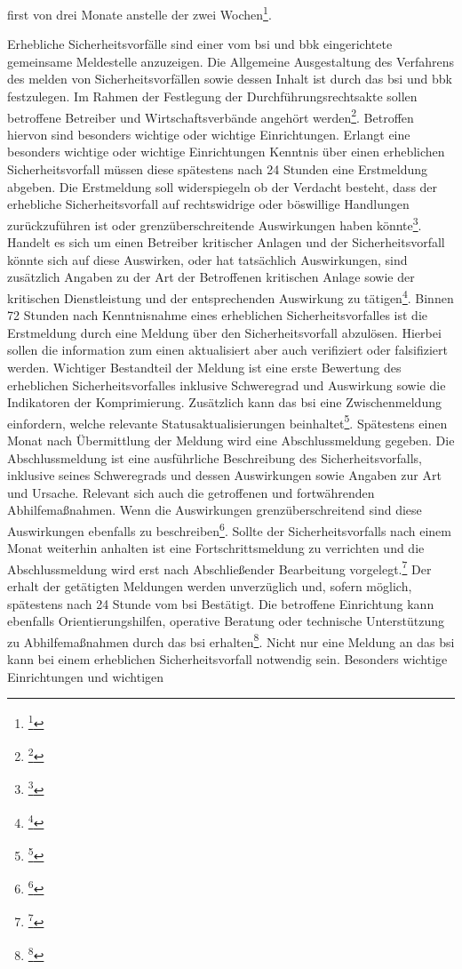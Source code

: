\documentclass[11pt,a4paper,hidelinks]{article}   %
\begin{document}
first von drei Monate anstelle der zwei Wochen\footnote{\footcite[Vgl. §34,][]{NIS2UmsuCG}}.\medbreak

        Erhebliche Sicherheitsvorfälle sind einer vom \gls{bsi} und \gls{bbk} eingerichtete gemeinsame Meldestelle anzuzeigen. Die Allgemeine Ausgestaltung des Verfahrens des melden von Sicherheitsvorfällen sowie dessen Inhalt ist durch das \gls{bsi} und \gls{bbk} festzulegen. Im Rahmen der Festlegung der Durchführungsrechtsakte sollen betroffene Betreiber und Wirtschaftsverbände angehört werden\footnote{\footcite[Vgl. §32, Absatz 4,][]{NIS2UmsuCG}}. Betroffen hiervon sind besonders wichtige oder wichtige Einrichtungen. Erlangt eine besonders wichtige oder wichtige Einrichtungen Kenntnis über einen erheblichen Sicherheitsvorfall müssen diese spätestens nach 24 Stunden eine Erstmeldung abgeben. Die Erstmeldung soll widerspiegeln ob der Verdacht besteht, dass der erhebliche Sicherheitsvorfall auf rechtswidrige oder böswillige Handlungen zurückzuführen ist oder grenzüberschreitende Auswirkungen haben könnte\footnote{\footcite[Vgl. §32, Absatz 1,][]{NIS2UmsuCG}}. Handelt es sich um einen Betreiber kritischer Anlagen und der Sicherheitsvorfall könnte sich auf diese Auswirken, oder hat tatsächlich Auswirkungen, sind zusätzlich Angaben zu der Art der Betroffenen kritischen Anlage sowie der kritischen Dienstleistung und der entsprechenden Auswirkung zu tätigen\footnote{\footcite[Vgl. §32, Absatz 3,][]{NIS2UmsuCG}}. Binnen 72 Stunden nach Kenntnisnahme eines erheblichen Sicherheitsvorfalles ist die Erstmeldung durch eine Meldung über den Sicherheitsvorfall abzulösen. Hierbei sollen die information zum einen aktualisiert aber auch verifiziert oder falsifiziert werden. Wichtiger Bestandteil der Meldung ist eine erste Bewertung des erheblichen Sicherheitsvorfalles inklusive Schweregrad und Auswirkung sowie die Indikatoren der Komprimierung. Zusätzlich kann das \gls{bsi} eine Zwischenmeldung einfordern, welche relevante Statusaktualisierungen beinhaltet\footnote{\footcite[Vgl. §32, Absatz 1, Nummer 2 und 3,][]{NIS2UmsuCG}}.  Spätestens einen Monat nach Übermittlung der Meldung wird eine Abschlussmeldung gegeben. Die Abschlussmeldung ist eine ausführliche  Beschreibung des Sicherheitsvorfalls, inklusive seines Schweregrads und dessen Auswirkungen sowie Angaben zur Art und Ursache. Relevant sich auch die getroffenen und fortwährenden Abhilfemaßnahmen. Wenn die Auswirkungen grenzüberschreitend sind diese Auswirkungen ebenfalls zu beschreiben\footnote{\footcite[Vgl. §32, Absatz 4,][]{NIS2UmsuCG}}. Sollte der Sicherheitsvorfalls nach einem Monat weiterhin anhalten ist eine Fortschrittsmeldung zu verrichten und die Abschlussmeldung wird erst nach Abschließender Bearbeitung vorgelegt.\footnote{\footcite[Vgl. §32, Absatz 2,][]{NIS2UmsuCG}} Der erhalt der getätigten Meldungen werden unverzüglich und, sofern möglich, spätestens nach 24 Stunde vom \gls{bsi} Bestätigt. Die betroffene Einrichtung kann ebenfalls Orientierungshilfen, operative Beratung oder technische Unterstützung zu Abhilfemaßnahmen durch das \gls{bsi} erhalten\footnote{\footcite[Vgl. §36, Absatz 1,][]{NIS2UmsuCG}}. Nicht nur eine Meldung an das \gls{bsi} kann bei einem erheblichen Sicherheitsvorfall notwendig sein. Besonders wichtige Einrichtungen und wichtigen 
\end{document}
